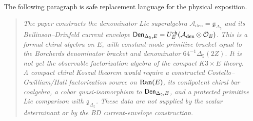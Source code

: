 \begin{remark}
\label{rem:cellten-replacement-language}
The following paragraph is safe replacement language for the physical
exposition.

\begin{quote}
\emph{The paper constructs the denominator Lie superalgebra
\(\mathcal A_{\mathrm{den}}=\mathfrak g_{\Delta_5}\) and its
Beilinson--Drinfeld current envelope
\(\mathsf{Den}_{\Delta_5,E}=U_E^{\mathrm{ch}}(\mathcal A_{\mathrm{den}}\otimes
\mathcal O_E)\).  This is a formal chiral algebra on \(E\), with
constant-mode primitive bracket equal to the Borcherds denominator
bracket and denominator \(64^{-1}\Delta_5(2Z)\).  It is not yet the
observable factorization algebra of the compact \(K3\times E\) theory.
A compact chiral Koszul theorem would require a constructed
Costello--Gwilliam/Hall factorization source on \(\operatorname{Ran}(E)\), its
conilpotent chiral bar coalgebra, a cobar quasi-isomorphism to
\(\mathsf{Den}_{\Delta_5,E}\), and a protected primitive Lie comparison with
\(\mathfrak g_{\Delta_5}\).  These data are not supplied by the scalar
determinant or by the BD current-envelope construction.}
\end{quote}
\end{remark}
